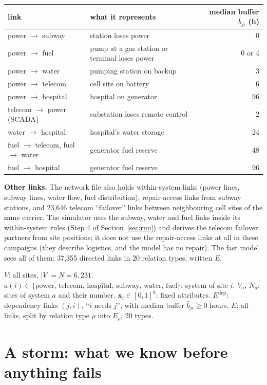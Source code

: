 \documentclass[11pt]{article}
\newcommand{\dep}{\mathrm{dep}}
\begin{document}
\begin{center}\small
\begin{tabular}{llr}
\toprule
link & what it represents & median buffer $\bar b_{ji}$ (h)\\
\midrule
power $\to$ subway & station loses power & 0 \\
power $\to$ fuel & pump at a gas station or terminal loses power & 0 or 4 \\
power $\to$ water & pumping station on backup & 3 \\
power $\to$ telecom & cell site on battery & 6 \\
power $\to$ hospital & hospital on generator & 96 \\
telecom $\to$ power (SCADA) & substation loses remote control & 2 \\
water $\to$ hospital & hospital's water storage & 24 \\
fuel $\to$ telecom, fuel $\to$ water & generator fuel reserve & 48 \\
fuel $\to$ hospital & generator fuel reserve & 96 \\
\bottomrule
\end{tabular}
\end{center}

\textbf{Other links.} The network file also holds within-system links (power lines, subway lines, water flow, fuel distribution), repair-access links from subway stations, and 23,646 telecom ``failover'' links between neighbouring cell sites of the same carrier. The simulator uses the subway, water and fuel links inside its within-system rules (Step 4 of Section~\ref{sec:run}) and derives the telecom failover partners from site positions; it does not use the repair-access links at all in these campaigns (they describe logistics, and the model has no repair). The fast model sees all of them: 37,355 directed links in 20 relation types, written $E$.

\begin{maths}
$V$: all sites, $|V|=N=6{,}231$. $a(i)\in\{\text{power, telecom, hospital, subway, water, fuel}\}$: system of site $i$. $V_a$, $N_a$: sites of system $a$ and their number. $\mathbf x_i\in[0,1]^8$: fixed attributes. $E^{\dep}$: dependency links $(j,i)$, ``$i$ needs $j$'', with median buffer $\bar b_{ji}\ge0$ hours. $E$: all links, split by relation type $\rho$ into $E_\rho$, 20 types.
\end{maths}

\section{A storm: what we know before anything fails}\label{sec:storm}
\end{document}
